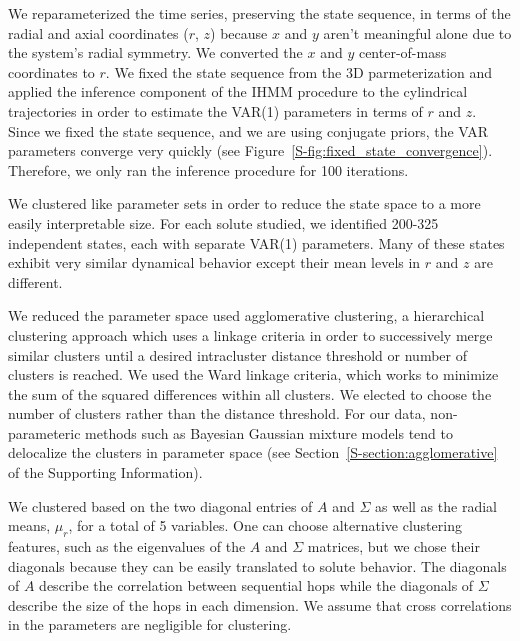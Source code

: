 \documentclass{article}
\begin{document}
  We reparameterized the time series, preserving the state sequence, in terms
  of the radial and axial coordinates ($r$, $z$) because $x$ and $y$ aren't 
  meaningful alone due to the system's radial symmetry. We converted the $x$ and 
  $y$ center-of-mass coordinates to $r$. We fixed the state sequence from the 
  3D parmeterization and applied the inference component of the IHMM procedure
  to the cylindrical trajectories in order to estimate the VAR(1) parameters in
  terms of $r$ and $z$. Since we fixed the state sequence, and we are using conjugate
  priors, the VAR parameters converge very quickly (see Figure~\ref{S-fig:fixed_state_convergence}). Therefore, we only ran 
  the inference procedure for 100 iterations. 
  
  We clustered like parameter sets in order to reduce the state space to
  a more easily interpretable size. For each solute studied, we identified 200-325
  independent states, each with separate VAR(1) parameters. Many of these states
  exhibit very similar dynamical behavior except their mean levels in $r$ and $z$
  are different.
  
  We reduced the parameter space used agglomerative clustering, a hierarchical
  clustering approach which uses a linkage criteria in order to successively merge
  similar clusters until a desired intracluster distance threshold or number of
  clusters is reached. We used the Ward linkage criteria, which works to minimize 
  the sum of the squared differences within all clusters.
  We elected to choose the number of clusters rather than the distance threshold.
  For our data, non-parameteric methods such as Bayesian Gaussian mixture models tend
  to delocalize the clusters in parameter space (see Section~\ref{S-section:agglomerative}
  of the Supporting Information).
  
  We clustered based on the two diagonal entries of $A$ and $\Sigma$ as well as the
  radial means, $\mu_r$, for a total of 5 variables. One can choose alternative clustering
  features, such as the eigenvalues of the $A$ and $\Sigma$ matrices, but we chose their 
  diagonals because they can be easily translated to solute behavior. The diagonals of $A$
  describe the correlation between sequential hops while the diagonals of $\Sigma$ describe
  the size of the hops in each dimension. We assume that cross correlations in the parameters
  are negligible for clustering.
   
\end{document}
